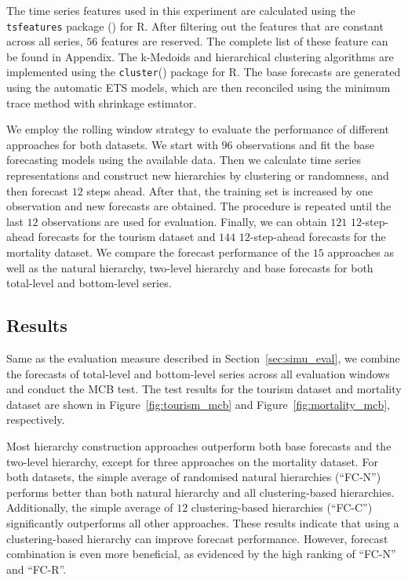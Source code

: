 \documentclass[a4paper,review,12pt,authoryear]{elsarticle}
\begin{document}
The time series features used in this experiment are calculated using the \texttt{tsfeatures} package (\citealp{tsfeatures}) for R. After filtering out the features that are constant across all series, $56$ features are reserved. The complete list of these feature can be found in Appendix. The k-Medoids and hierarchical clustering algorithms are implemented using the \texttt{cluster}(\citealp{cluster}) package for R. The base forecasts are generated using the automatic ETS models, which are then reconciled using the minimum trace method with shrinkage estimator.

We employ the rolling window strategy to evaluate the performance of different approaches for both datasets. We start with $96$ observations and fit the base forecasting models using the available data. Then we calculate time series representations and construct new hierarchies by clustering or randomness, and then forecast $12$ steps ahead. After that, the training set is increased by one observation and new forecasts are obtained. The procedure is repeated until the last $12$ observations are used for evaluation. Finally, we can obtain $121$ $12$-step-ahead forecasts for the tourism dataset and $144$ $12$-step-ahead forecasts for the mortality dataset. We compare the forecast performance of the $15$ approaches as well as the natural hierarchy, two-level hierarchy and base forecasts for both total-level and bottom-level series. 

\subsection{Results}

Same as the evaluation measure described in Section~\ref{sec:simu_eval}, we combine the forecasts of total-level and bottom-level series across all evaluation windows and conduct the MCB test. The test results for the tourism dataset and mortality dataset are shown in Figure~\ref{fig:tourism_mcb} and Figure~\ref{fig:mortality_mcb}, respectively.

Most hierarchy construction approaches outperform both base forecasts and the two-level hierarchy, except for three approaches on the mortality dataset. For both datasets, the simple average of randomised natural hierarchies (``FC-N'') performs better than both natural hierarchy and all clustering-based hierarchies. Additionally, the simple average of $12$ clustering-based hierarchies (``FC-C'') significantly outperforms all other approaches. These results indicate that using a clustering-based hierarchy can improve forecast performance. However, forecast combination is even more beneficial, as evidenced by the high ranking of ``FC-N'' and ``FC-R''.
\end{document}

